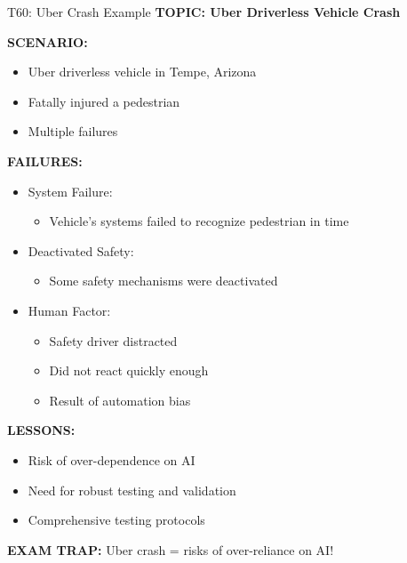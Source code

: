 \documentclass[8pt]{beamer}
\begin{document}
	\begin{frame}{T60: Uber Crash Example}
		\fontsize{6.5}{7.5}\selectfont
		\textbf{TOPIC: Uber Driverless Vehicle Crash}
		
		\vspace{0.1cm}
		\textbf{SCENARIO:}
		\begin{itemize}
			\item Uber driverless vehicle in Tempe, Arizona
			\item Fatally injured a pedestrian
			\item Multiple failures
		\end{itemize}
		
		\vspace{0.1cm}
		\textbf{FAILURES:}
		\begin{itemize}
			\item \textcolor{myblue}{System Failure:}
			\begin{itemize}
				\item Vehicle's systems failed to recognize pedestrian in time
			\end{itemize}
			\item \textcolor{myblue}{Deactivated Safety:}
			\begin{itemize}
				\item Some safety mechanisms were deactivated
			\end{itemize}
			\item \textcolor{myblue}{Human Factor:}
			\begin{itemize}
				\item Safety driver distracted
				\item Did not react quickly enough
				\item Result of automation bias
			\end{itemize}
		\end{itemize}
		
		\vspace{0.1cm}
		\textbf{LESSONS:}
		\begin{itemize}
			\item Risk of over-dependence on AI
			\item Need for robust testing and validation
			\item Comprehensive testing protocols
		\end{itemize}
		
		\textcolor{myred}{\textbf{EXAM TRAP:}} Uber crash = \textcolor{myblue}{risks of over-reliance on AI}!
	\end{frame}
	
\end{document}

